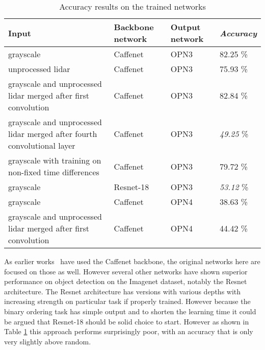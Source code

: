 \begin{table}[]
\centering
\caption{Accuracy results on the trained networks}
\label{tab:results}
\begin{tabular}{|p{5cm}|p{2cm}|p{2cm}|p{2cm}|}
\hline
\textbf{Input}                                                          & \textbf{Backbone network} & \textbf{Output network} & \textit{\textbf{Accuracy}} \\ \hline
grayscale                                                               & Caffenet                  & OPN3                    & 82.25 \%                   \\ \hline
unprocessed lidar                                                       & Caffenet                  & OPN3                    & 75.93 \%                   \\ \hline
grayscale and unprocessed lidar merged after first convolution          & Caffenet                  & OPN3                    & 82.84 \%                   \\ \hline
grayscale and unprocessed lidar merged after fourth convolutional layer & Caffenet                  & OPN3                    & \textit{49.25} \%          \\ \hline
grayscale with training on non-fixed time differences                   & Caffenet                  & OPN3                    & 79.72 \%                   \\ \hline
grayscale                                                               & Resnet-18                 & OPN3                    & \textit{53.12} \%          \\ \hline
grayscale                                                               & Caffenet                  & OPN4                    & 38.63 \%                   \\ \hline
grayscale and unprocessed lidar merged after first convolution          & Caffenet                  & OPN4                    & 44.42 \%                   \\ \hline
\end{tabular}
\end{table}

As earlier works~\cite{misra2016,lee2017} have used the Caffenet backbone, the original networks here are focused on those as well. However several other networks have shown superior performance on object detection on the Imagenet dataset, notably the Resnet architecture\cite{he2016}. The Resnet architecture has versions with various depths with increasing strength on particular task if properly trained. However because the binary ordering task has simple output and to shorten the learning time it could be argued that Resnet-18 should be solid choice to start. However as shown in Table \ref{tab:results} this approach performs surprisingly poor, with an accuracy that is only very slightly above random.

